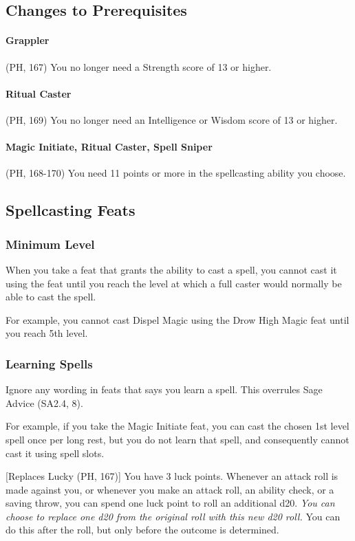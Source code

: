 \documentclass[letterpaper,twocolumn,openany,nodeprecatedcode]{dndbook}
\begin{document}
\subsection{Changes to Prerequisites}

\paragraph{Grappler} (PH, 167) You no longer need a Strength score of 13 or higher.

\paragraph{Ritual Caster} (PH, 169) You no longer need an Intelligence or Wisdom score of 13 or higher.

\paragraph{Magic Initiate, Ritual Caster, Spell Sniper} (PH, 168-170) You need 11 points or more in the spellcasting ability you choose.

\subsection{Spellcasting Feats}

\subsubsection{Minimum Level}
When you take a feat that grants the ability to cast a spell, you cannot cast it using the feat until you reach the level at which a full caster would normally be able to cast the spell.

For example, you cannot cast Dispel Magic using the Drow High Magic feat until you reach 5th level.

\subsubsection{Learning Spells}
Ignore any wording in feats that says you learn a spell. This overrules Sage Advice (SA2.4, 8).

For example, if you take the Magic Initiate feat, you can cast the chosen 1st level spell once per long rest, but you do not learn that spell, and consequently cannot cast it using spell slots.

[Replaces Lucky (PH, 167)]
You have 3 luck points. Whenever an attack roll is made against you, or whenever you make an attack roll, an ability check, or a saving throw, you can spend one luck point to roll an additional d20. \textit{You can choose to replace one d20 from the original roll with this new d20 roll.} You can do this after the roll, but only before the outcome is determined.
\end{document}
